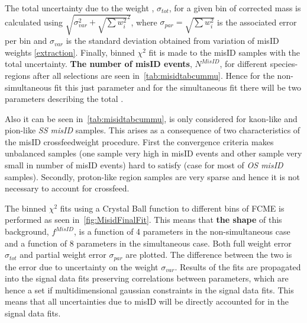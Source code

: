 The total uncertainty due to the weight \DIFaddbegin {}\DIFaddend , $\sigma_{tot}$, for a given bin of corrected mass is calculated using $\sqrt{\sigma_{var}^2 +\sqrt{\sum{w^{2}_{i}}}^{2}}$, where $\sigma_{par}=\sqrt{\sum{w^{2}_{i}}}$ is the associated error per bin and $\sigma_{var}$ is the standard deviation obtained from \DIFaddbegin {}\DIFaddend variation of misID weights \DIFaddbegin {}\autoref{extraction}\DIFaddend . Finally, \DIFdelbegin {}\DIFdelend \DIFaddbegin {}\DIFaddend binned $\chi^{2}$ fit is made to the misID samples with the total uncertainty. \textbf{The number of misID events}, $N^{MisID}$, for different species-regions after all selections are seen in~\autoref{tab:misidtabcummu}. Hence for the non-simultaneous fit this just \DIFdelbegin {}\DIFdelend \DIFaddbegin {} parameter and for the simultaneous fit there will be two parameters describing the total \DIFdelbegin {}\DIFdelend \DIFaddbegin {}\DIFaddend .

Also it can be seen in~\autoref{tab:misidtabcummu}, \DIFdelbegin {}\DIFdelend \DIFaddbegin {}\DIFaddend is only considered for kaon-like and pion-like \textit{SS misID} samples. This arises as a consequence of two characteristics of the misID crossfeedweight procedure. First the convergence criteria makes unbalanced samples (one sample very high in misID events and other sample very small in number of misID events) hard to satisfy (case for most of \textit{OS misID} samples). Secondly, proton-like region samples are very sparse and hence it is not necessary to account for crossfeed. %

The binned $\chi^{2}$ fits using a Crystal Ball function to different bins of FCME is performed as seen in~\autoref{fig:MisidFinalFit}. This means that \textbf{the shape} of this background, $f^{MisID}$, is a function of 4 parameters in the non-simultaneous case and a function of 8 parameters in the simultaneous case. Both full weight error $\sigma_{tot}$ and partial weight error $\sigma_{par}$ are plotted. The difference between the two \DIFdelbegin \DIFdel{, }\DIFdelend is the error due to uncertainty on the weight $\sigma_{var}$.  Results of the fits are propagated into the signal data fits preserving correlations between parameters, which are hence a set if multidimensional gaussian constraints in the signal data fits. This means that all uncertainties due to misID will be directly accounted for in the signal data fits.


